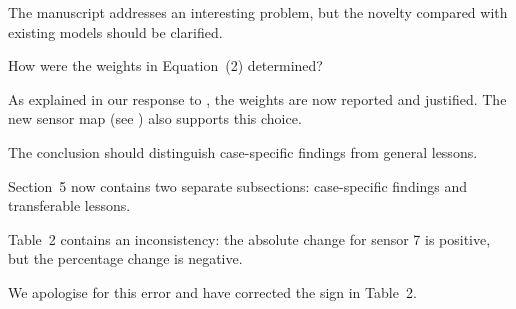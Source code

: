 \documentclass[11pt,english]{authorresponseletter}
\begin{document}
\reviewer

\begin{generalcomment}
The manuscript addresses an interesting problem, but the novelty compared with existing models should be clarified.
\end{generalcomment}

\begin{generalresponse}
\end{generalresponse}

\begin{revcomment}
\label{r2:c1}
How were the weights in Equation~(2) determined?
\end{revcomment}
\begin{revresponse}
As explained in our response to , the weights are now reported and justified. The new sensor map (see ) also supports this choice.
\end{revresponse}

\begin{revcomment}
\label{r2:c2}
The conclusion should distinguish case-specific findings from general lessons.
\end{revcomment}
\begin{revresponse}
Section~5 now contains two separate subsections: case-specific findings and transferable lessons.
\end{revresponse}

\begin{revcomment}
\label{r2:c3}
Table~2 contains an inconsistency: the absolute change for sensor 7 is positive, but the percentage change is negative.
\end{revcomment}
\begin{revresponse}
We apologise for this error and have corrected the sign in Table~2.
\end{revresponse}
\end{document}

